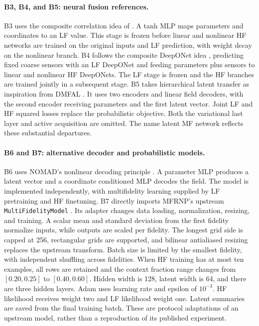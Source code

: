 \paragraph{B3, B4, and B5: neural fusion references.}
B3 uses the composite correlation idea of \citet{meng2020}. A tanh MLP maps
parameters and coordinates to an LF value. This stage is frozen before linear
and nonlinear HF networks are trained on the original inputs and LF prediction,
with weight decay on the nonlinear branch. B4 follows the composite DeepONet
idea \citep{howard2023}, predicting fixed coarse sensors with an LF DeepONet and
feeding parameters plus sensors to linear and nonlinear HF DeepONets. The LF
stage is frozen and the HF branches are trained jointly in a subsequent stage. B5 takes hierarchical
latent transfer as inspiration from DMFAL \citep{li2022dmfal}. It uses two encoders
and linear field decoders, with the second encoder receiving parameters and the
first latent vector. Joint LF and HF squared losses replace the probabilistic
objective. Both the variational last layer and active acquisition are omitted.
The name latent MF network reflects these substantial departures.

\paragraph{B6 and B7: alternative decoder and probabilistic models.}
B6 uses NOMAD's nonlinear decoding principle \citep{seidman2022}. A parameter MLP
produces a latent vector and a coordinate conditioned MLP decodes the field.
The model is implemented independently, with multifidelity learning supplied by
LF pretraining and HF finetuning. B7 directly imports MFRNP's upstream
\texttt{MultiFidelityModel} \citep{niu2024}. Its adapter changes data loading,
normalization, resizing, and training. A scalar mean and standard deviation from
the first fidelity normalize inputs, while outputs are scaled per fidelity.
The longest grid side is capped at 256, rectangular grids are supported, and
bilinear antialiased resizing replaces the upstream transform. Batch size is
limited by the smallest fidelity, with independent shuffling across fidelities.
When HF training has at most ten examples, all rows are retained and the context
fraction range changes from $[0.20,0.25]$ to $[0.40,0.60]$. Hidden width is 128,
latent width is 64, and there are three hidden layers. Adam uses learning rate
and epsilon of $10^{-3}$. HF likelihood receives weight two and LF likelihood
weight one. Latent summaries are saved from the final training batch. These are
protocol adaptations of an upstream model, rather than a reproduction of its
published experiment.

